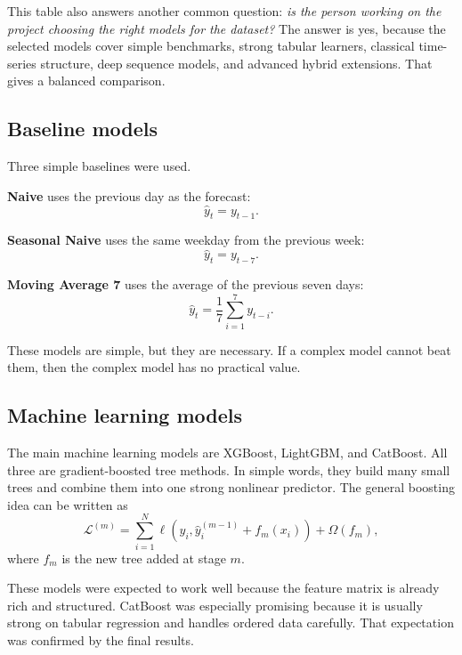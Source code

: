 \documentclass[conference]{IEEEtran}
\begin{document}
This table also answers another common question: \emph{is the person working on the project choosing the right models for the dataset?} The answer is yes, because the selected models cover simple benchmarks, strong tabular learners, classical time-series structure, deep sequence models, and advanced hybrid extensions. That gives a balanced comparison.

\subsection{Baseline models}
Three simple baselines were used.

\textbf{Naive} uses the previous day as the forecast:
\begin{equation}
\hat{y}_t = y_{t-1}.
\end{equation}

\textbf{Seasonal Naive} uses the same weekday from the previous week:
\begin{equation}
\hat{y}_t = y_{t-7}.
\end{equation}

\textbf{Moving Average 7} uses the average of the previous seven days:
\begin{equation}
\hat{y}_t = \frac{1}{7}\sum_{i=1}^{7} y_{t-i}.
\end{equation}

These models are simple, but they are necessary. If a complex model cannot beat them, then the complex model has no practical value.

\subsection{Machine learning models}
The main machine learning models are XGBoost, LightGBM, and CatBoost. All three are gradient-boosted tree methods. In simple words, they build many small trees and combine them into one strong nonlinear predictor. The general boosting idea can be written as
\begin{equation}
\mathcal{L}^{(m)} = \sum_{i=1}^{N}\ell\!\left(y_i,\hat{y}^{(m-1)}_i + f_m(x_i)\right) + \Omega(f_m),
\end{equation}
where $f_m$ is the new tree added at stage $m$.

These models were expected to work well because the feature matrix is already rich and structured. CatBoost was especially promising because it is usually strong on tabular regression and handles ordered data carefully. That expectation was confirmed by the final results.
\end{document}
